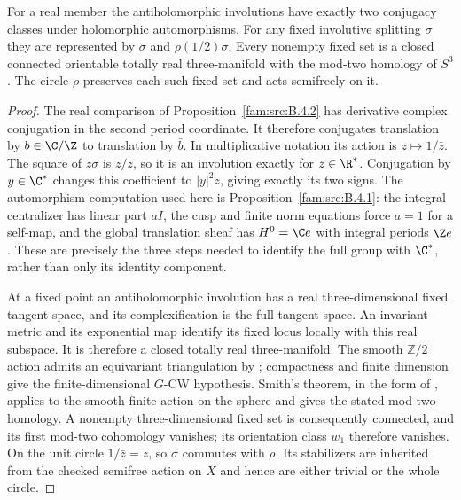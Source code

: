 \begin{proposition}\label{mapsI:src:A.3.1}
For a real member the antiholomorphic involutions have exactly two
conjugacy classes under holomorphic automorphisms. For any fixed
involutive splitting $\sigma$ they are represented by $\sigma$ and
$\rho(1/2)\sigma$. Every nonempty fixed set is a closed connected
orientable totally real three-manifold with the mod-two homology of
$S^3$. The circle $\rho$ preserves each such fixed set and acts
semifreely on it.
\end{proposition}

\begin{proof}
The real comparison of Proposition~\ref{fam:src:B.4.2} has derivative complex conjugation in the
second period coordinate. It therefore conjugates translation by
$b\in\C/\Z$ to translation by $\bar b$. In multiplicative notation its
action is $z\mapsto1/\bar z$. The square of $z\sigma$ is $z/\bar z$,
so it is an involution exactly for $z\in\R^*$. Conjugation by $y\in\C^*$
changes this coefficient to $|y|^2z$, giving exactly its two signs.
The automorphism computation used here is Proposition~\ref{fam:src:B.4.1}: the integral centralizer has linear part $aI$, the cusp and
finite norm equations force $a=1$ for a self-map, and the global
translation sheaf has $H^0=\C e$ with integral periods $\Z e$.
These are precisely the three steps needed to identify the full group
with $\C^*$, rather than only its identity component.

At a fixed point an antiholomorphic involution has a real three-dimensional
fixed tangent space, and its complexification is the full tangent space.
An invariant metric and its exponential map identify its fixed locus
locally with this real subspace. It is therefore a closed totally real
three-manifold. The smooth $\mathbb Z/2$ action admits an equivariant
triangulation by \cite[Theorem~3.1, p.~48]{Illman1972}; compactness and finite
dimension give the finite-dimensional $G$-CW hypothesis. Smith's theorem,
in the form of
\cite[Theorem 4.1(1)]{Knudson2004}, applies to the smooth finite action on
the sphere and gives the stated mod-two homology. A nonempty
three-dimensional fixed set is consequently connected, and its first
mod-two cohomology vanishes; its orientation class $w_1$ therefore
vanishes. On the unit circle $1/\bar z=z$, so $\sigma$ commutes with
$\rho$. Its stabilizers are inherited from the checked semifree action
on $X$ and hence are either trivial or the whole circle.
\end{proof}

